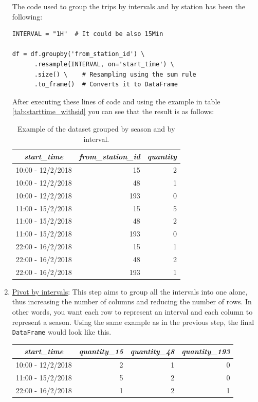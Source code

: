 \begin{enumerate}
    The code used to group the trips by intervals and by station has been the following:
    
    \begin{verbatim}
INTERVAL = "1H"  # It could be also 15Min

df = df.groupby('from_station_id') \
      .resample(INTERVAL, on='start_time') \
      .size() \    # Resampling using the sum rule
      .to_frame()  # Converts it to DataFrame
    \end{verbatim}
    
After executing these lines of code and using the example in table \ref{tab:starttime_withsid} you can see that the result is as follows:
    \begin{table}[H]
    \footnotesize
    \centering
    \begin{tabular}{c|rr}
        \toprule
          \textit{start\_time} & \textit{from\_station\_id} & \textit{quantity}  \\
        \midrule
        
        10:00 - 12/2/2018 & 15 & 2\\
        10:00 - 12/2/2018 & 48 & 1\\
        10:00 - 12/2/2018 & 193 & 0\\
        11:00 - 15/2/2018 & 15 & 5\\
        11:00 - 15/2/2018 & 48 & 2\\
        11:00 - 15/2/2018 & 193 & 0\\
        22:00 - 16/2/2018 & 15 & 1\\
        22:00 - 16/2/2018 & 48 & 2\\
        22:00 - 16/2/2018 & 193 & 1\\
        \bottomrule
    \end{tabular}
    \cprotect\caption{Example of the dataset grouped by season and by interval.}
    \label{tab:justintervals}
    \end{table}
    
    
    \item \underline{Pivot by intervals}: This step aims to group all the intervals into one alone, thus increasing the number of columns and reducing the number of rows. In other words, you want each row to represent an interval and each column to represent a season. Using the same example as in the previous step, the final \small{\verb|DataFrame|} \normalsize  would look like this.
    \begin{table}[H]
    \footnotesize
    \centering
    \begin{tabular}{c|rrr}
        \toprule
        \textit{start\_time} & \textit{quantity\_15} & \textit{quantity\_48} & \textit{quantity\_193}  \\
        \midrule
        10:00 - 12/2/2018 & 2 & 1 & 0 \\
        11:00 - 15/2/2018 & 5 & 2 & 0 \\
        22:00 - 16/2/2018 & 1 & 2 & 1 \\
        

\end{tabular}
\end{table}
\end{enumerate}
